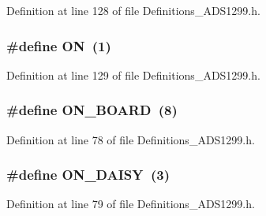 Definition at line 128 of file Definitions\+\_\+\+A\+D\+S1299.\+h.

\subsubsection[{\texorpdfstring{ON}{ON}}]{\setlength{\rightskip}{0pt plus 5cm}\#define ON~(1)}\hypertarget{group__Definitions__ADS1299_gad76d1750a6cdeebd506bfcd6752554d2}{}\label{group__Definitions__ADS1299_gad76d1750a6cdeebd506bfcd6752554d2}


Definition at line 129 of file Definitions\+\_\+\+A\+D\+S1299.\+h.

\subsubsection[{\texorpdfstring{O\+N\+\_\+\+B\+O\+A\+RD}{ON_BOARD}}]{\setlength{\rightskip}{0pt plus 5cm}\#define O\+N\+\_\+\+B\+O\+A\+RD~(8)}\hypertarget{group__Definitions__ADS1299_ga7a84be7ecbfcd0786f37e45af2682de2}{}\label{group__Definitions__ADS1299_ga7a84be7ecbfcd0786f37e45af2682de2}


Definition at line 78 of file Definitions\+\_\+\+A\+D\+S1299.\+h.

\subsubsection[{\texorpdfstring{O\+N\+\_\+\+D\+A\+I\+SY}{ON_DAISY}}]{\setlength{\rightskip}{0pt plus 5cm}\#define O\+N\+\_\+\+D\+A\+I\+SY~(3)}\hypertarget{group__Definitions__ADS1299_gaa7f391503e74618fa6974101490669ef}{}\label{group__Definitions__ADS1299_gaa7f391503e74618fa6974101490669ef}


Definition at line 79 of file Definitions\+\_\+\+A\+D\+S1299.\+h.

